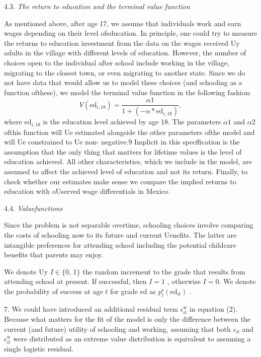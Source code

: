 4.3. {\it The return to education and the terminal value function}

As mentioned above, after age 17, we assume that individuals work and earn wages depending on their level ofeducation. In principle, one could try to measure the returns to education investment from the data on the wages received Uy adults in the village with different levels of education. However, the number of choices open to the individual after school include working in the village, migrating to the closest town, or even migrating to another state. Since we do not have data that would allow us to model these choices (and schooling as a function ofthese), we model the terminal value function in the following fashion:
$$
V(\mathrm{e}\mathrm{d}_{i,18})=\frac{\alpha 1}{1+(-\alpha*\mathrm{e}\mathrm{d}_{i,18})},
$$
where $\mathrm{e}\mathrm{d}_{i,18}$ is the education level achieved by age 18. The parameters $\alpha 1$ and $\alpha 2$ ofthis function will Ue estimated alongside the other parameters ofthe model and will Ue constrained to Ue non- negative.9 Implicit in this specffication is the assumption that the only thing that matters for lifetime values is the level of education achieved. All other characteristics, which we include in the model, are assumed to affect the achieved level of education and not its return. Finally, to check whether our estimates make sense we compare the implied returns to education with oUserved wage differentials in Mexico.

4.4. {\it Valuefunctions}

Since the problem is not separable overtime, schooling choices involve comparing the costs of schooling now to its future and current Uenefits. The latter are intangible preferences for attending school including the potential childcare benefits that parents may enjoy.

We denote Uy $I\in\{0$, 1$\}$ the random increment to the grade that results from attending school at present. If successful, then $I=1$ , otherwise $I=0$. We denote the probability of success at age $t$ for grade ed as $p_{t}^{\mathrm{s}}(\mathrm{e}\mathrm{d}_{it})$ .

7. We could have introduced an additional residual term $\epsilon_{it}^{\mathrm{w}}$ in equation (2). Because what matters for the fit of the model is only the difference between the current (and future) utility of schooling and working, assuming that both $\epsilon_{it}$ and $\epsilon_{it}^{\mathrm{w}}$ were distributed as an extreme value distribution is equivalent to assuming a single logistic residual.

